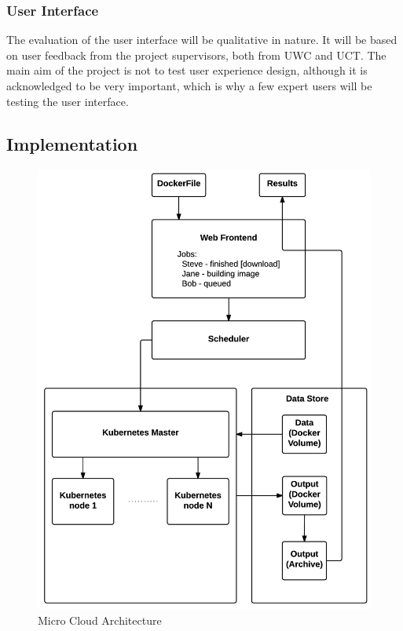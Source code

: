 \documentclass{sig-alternate-05-2015}
\begin{document}
\subsubsection{User Interface}
The evaluation of the user interface will be qualitative in nature. It will be based on user feedback from the project supervisors, both from UWC and UCT. The main aim of the project is not to test user experience design, although it is acknowledged to be very important, which is why a few expert users will be testing the user interface.  

\subsection{Implementation}

\begin{figure}
\centering
\includegraphics{img/microcloud_architecture}
\caption{Micro Cloud Architecture}
\end{figure}
\end{document}
